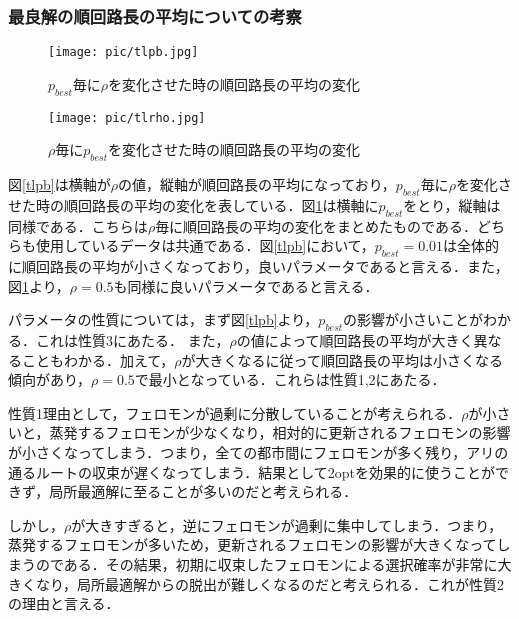 \documentclass[a4j]{jsarticle}
\begin{document}
\subsubsection{最良解の順回路長の平均についての考察}

\begin{figure}[htb]
 \begin{minipage}{0.5\hsize}
  \begin{center}
   \texttt{[image: pic/tlpb.jpg]}
  \end{center}
  \caption{$p_{best}$毎に$\rho$を変化させた時の順回路長の平均の変化}
  \label{tlpb}
 \end{minipage}
 \begin{minipage}{0.5\hsize}
  \begin{center}
   \texttt{[image: pic/tlrho.jpg]}
  \end{center}
  \caption{$\rho$毎に$p_{best}$を変化させた時の順回路長の平均の変化}
  \label{tlrho}
 \end{minipage}
\end{figure}

図\ref{tlpb}は横軸が$\rho$の値，縦軸が順回路長の平均になっており，$p_{best}$毎に$\rho$を変化させた時の順回路長の平均の変化を表している．図\ref{tlrho}は横軸に$p_{best}$をとり，縦軸は同様である．こちらは$\rho$毎に順回路長の平均の変化をまとめたものである．どちらも使用しているデータは共通である．図\ref{tlpb}において，$p_{best} = 0.01$は全体的に順回路長の平均が小さくなっており，良いパラメータであると言える．また，図\ref{tlrho}より，$\rho = 0.5$も同様に良いパラメータであると言える．
\par
パラメータの性質については，まず図\ref{tlpb}より，$p_{best}$の影響が小さいことがわかる．これは性質3にあたる．
また，$\rho$の値によって順回路長の平均が大きく異なることもわかる．加えて，$\rho$が大きくなるに従って順回路長の平均は小さくなる傾向があり，$\rho=0.5$で最小となっている．これらは性質1,2にあたる．
\par
性質1理由として，フェロモンが過剰に分散していることが考えられる．$\rho$が小さいと，蒸発するフェロモンが少なくなり，相対的に更新されるフェロモンの影響が小さくなってしまう．つまり，全ての都市間にフェロモンが多く残り，アリの通るルートの収束が遅くなってしまう．結果として2optを効果的に使うことができず，局所最適解に至ることが多いのだと考えられる．
\par
しかし，$\rho$が大きすぎると，逆にフェロモンが過剰に集中してしまう．つまり，蒸発するフェロモンが多いため，更新されるフェロモンの影響が大きくなってしまうのである．その結果，初期に収束したフェロモンによる選択確率が非常に大きくなり，局所最適解からの脱出が難しくなるのだと考えられる．これが性質2の理由と言える．
\end{document}
